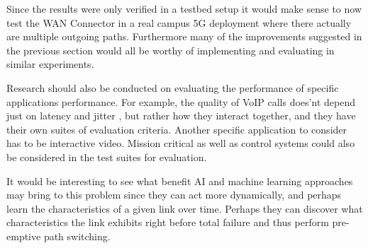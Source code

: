 Since the results were only verified in a testbed setup it would make sense to now test the WAN Connector in a real campus 5G deployment where there actually are multiple outgoing paths. Furthermore many of the improvements suggested in the previous section would all be worthy of implementing and evaluating in similar experiments.

Research should also be conducted on evaluating the performance of specific applications performance. For example, the quality of VoIP calls does'nt depend just on latency and jitter \cite{tao2005improving}, but rather how they interact together, and they have their own suites of evaluation criteria. Another specific application to consider has to be interactive video. Mission critical as well as control systems could also be considered in the test suites for evaluation.

It would be interesting to see what benefit AI and machine learning approaches may bring to this problem since they can act more dynamically, and perhaps learn the characteristics of a given link over time. Perhaps they can discover what characteristics the link exhibits right before total failure and thus perform pre-emptive path switching.

